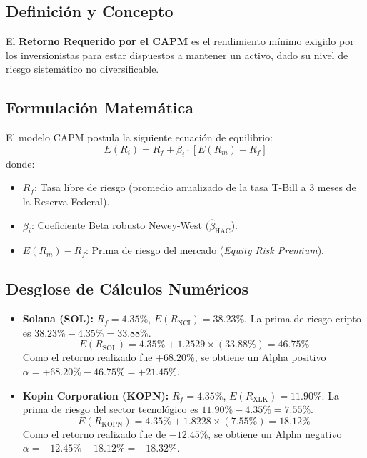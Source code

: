 \documentclass[11pt,a4paper]{article}
\begin{document}
\subsection{Definición y Concepto}
El \textbf{Retorno Requerido por el CAPM} es el rendimiento mínimo exigido por los inversionistas para estar dispuestos a mantener un activo, dado su nivel de riesgo sistemático no diversificable.

\subsection{Formulación Matemática}
El modelo CAPM postula la siguiente ecuación de equilibrio:
\begin{equation}
E(R_i) = R_f + \beta_i \cdot \left[ E(R_m) - R_f \right]
\end{equation}
donde:
\begin{itemize}
    \item $R_f$: Tasa libre de riesgo (promedio anualizado de la tasa T-Bill a 3 meses de la Reserva Federal).
    \item $\beta_i$: Coeficiente Beta robusto Newey-West ($\hat{\beta}_{\text{HAC}}$).
    \item $E(R_m) - R_f$: Prima de riesgo del mercado (\textit{Equity Risk Premium}).
\end{itemize}

\subsection{Desglose de Cálculos Numéricos}
\begin{itemize}
    \item \textbf{Solana (SOL):} $R_f = 4.35\%$, $E(R_{\text{NCI}}) = 38.23\%$. La prima de riesgo cripto es $38.23\% - 4.35\% = 33.88\%$.
    \begin{equation}
    E(R_{\text{SOL}}) = 4.35\% + 1.2529 \times (33.88\%) = \mathbf{46.75\%}
    \end{equation}
    Como el retorno realizado fue $+68.20\%$, se obtiene un Alpha positivo $\alpha = +68.20\% - 46.75\% = \mathbf{+21.45\%}$.
    
    \item \textbf{Kopin Corporation (KOPN):} $R_f = 4.35\%$, $E(R_{\text{XLK}}) = 11.90\%$. La prima de riesgo del sector tecnológico es $11.90\% - 4.35\% = 7.55\%$.
    \begin{equation}
    E(R_{\text{KOPN}}) = 4.35\% + 1.8228 \times (7.55\%) = \mathbf{18.12\%}
    \end{equation}
    Como el retorno realizado fue de $-12.45\%$, se obtiene un Alpha negativo $\alpha = -12.45\% - 18.12\% = \mathbf{-18.32\%}$.
\end{itemize}
\end{document}

